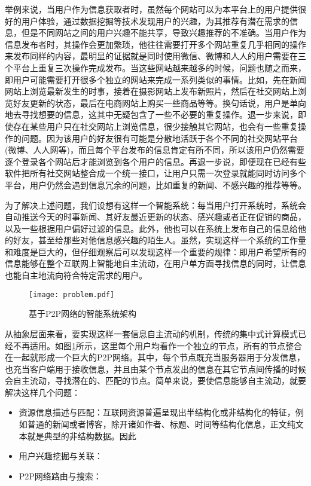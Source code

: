 举例来说，当用户作为信息获取者时，虽然每个网站可以为本平台上的用户提供很好的用户体验，通过数据挖掘等技术发现用户的兴趣，为其推荐有潜在需求的信息，但是不同网站之间的用户兴趣不能共享，导致兴趣推荐的不准确。当用户作为信息发布者时，其操作会更加繁琐，他往往需要打开多个网站重复几乎相同的操作来发布同样的内容，最明显的证据就是同时使用微信、微博和人人的用户需要在三个平台上重复三次操作完成发布。当这些网站越来越多的时候，问题也随之而来，即用户可能需要打开很多个独立的网站来完成一系列类似的事情。比如，先在新闻网站上浏览最新发生的时事，接着在摄影网站上发布新照片，然后在社交网站上浏览好友更新的状态，最后在电商网站上购买一些商品等等。换句话说，用户是单向地去寻找想要的信息，这其中无疑包含了一些不必要的重复操作。退一步来说，即使存在某些用户只在社交网站上浏览信息，很少接触其它网站，也会有一些重复操作的问题。因为该用户的好友很有可能是分散地活跃于各个不同的社交网站平台(微博、人人网等)，而且每个平台发布的信息肯定有所不同，所以该用户仍然需要逐个登录各个网站后才能浏览到各个用户的信息。再退一步说，即便现在已经有些软件把所有社交网站整合成一个统一接口，让用户只需一次登录就能同时访问多个平台，用户仍然会遇到信息冗余的问题，比如重复的新闻、不感兴趣的推荐等等。

为了解决上述问题，我们设想有这样一个智能系统：每当用户打开系统时，系统会自动推送今天的时事新闻、其好友最近更新的状态、感兴趣或者正在促销的商品，以及一些根据用户偏好过滤的信息。此外，他也可以在系统上发布自己的信息给他的好友，甚至给那些对他信息感兴趣的陌生人。虽然，实现这样一个系统的工作量和难度是巨大的，但仔细观察后可以发现这样一个重要的规律：即用户希望所有的信息能够在整个互联网上智能地自主流动，在用户单方面寻找信息的同时，让信息也能自主地流向符合特定需求的用户。

\begin{figure}[ht]
\centering
\texttt{[image: problem.pdf]}
\caption{基于P2P网络的智能系统架构}
\label{fig:solution}
\end{figure}

从抽象层面来看，要实现这样一套信息自主流动的机制，传统的集中式计算模式已经不再适用。如图\ref{fig:solution}所示，这里每个用户均看作一个独立的节点，所有的节点整合在一起就形成一个巨大的P2P网络。其中，每个节点既充当服务器用于分发信息，也充当客户端用于接收信息，并且由某个节点发出的信息在其它节点间传播的时候会自主流动，寻找潜在的、匹配的节点。简单来说，要使信息能够自主流动，就要解决这样几个问题：

\begin{itemize}
\item 资源信息描述与匹配：互联网资源普遍呈现出半结构化或非结构化的特征，例如普通的新闻或者博客，除开诸如作者、标题、时间等结构化信息，正文纯文本就是典型的非结构数据。因此
\item 用户兴趣挖掘与关联：
\item P2P网络路由与搜索：
\end{itemize}


